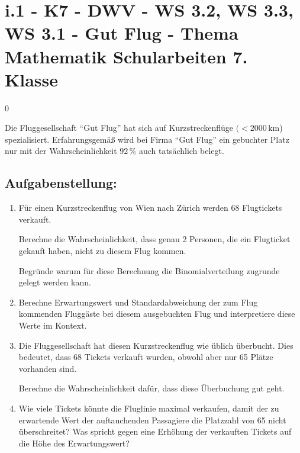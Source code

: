 \section{i.1 - K7 - DWV - WS 3.2, WS 3.3, WS 3.1 - Gut Flug - Thema Mathematik Schularbeiten 7. Klasse}

\begin{langesbeispiel} \item[0] %
	
Die Fluggesellschaft "`Gut Flug"' hat sich auf Kurzstreckenflüge $(<2000$\,km) spezialisiert. Erfahrungsgemäß wird bei Firma "`Gut Flug"' ein gebuchter Platz nur mit der Wahrscheinlichkeit $92\,\%$ auch tatsächlich belegt.

\subsection{Aufgabenstellung:}
\begin{enumerate}
	\item Für einen Kurzstreckenflug von Wien nach Zürich werden 68 Flugtickets verkauft.\leer
	
	 Berechne die Wahrscheinlichkeit, dass genau 2 Personen, die ein Flugticket gekauft haben, nicht zu diesem Flug kommen.\leer
	
	Begründe warum für diese Berechnung die Binomialverteilung zugrunde gelegt werden kann.\leer
	
	\item Berechne Erwartungswert und Standardabweichung der zum Flug kommenden Fluggäste bei diesem ausgebuchten Flug und interpretiere diese Werte im Kontext.\leer
	
	\item Die Fluggesellschaft hat diesen Kurzstreckenflug wie üblich überbucht. Dies bedeutet, dass 68 Tickets verkauft wurden, obwohl aber nur 65 Plätze vorhanden sind.\leer
	
	Berechne die Wahrscheinlichkeit dafür, dass diese Überbuchung gut geht.
	
	\item Wie viele Tickets könnte die Fluglinie maximal verkaufen, damit der zu erwartende Wert der auftauchenden Passagiere die Platzzahl von 65 nicht überschreitet? Was spricht gegen eine Erhöhung der verkauften Tickets auf die Höhe des Erwartungswert?
\end{enumerate}

\end{langesbeispiel}
